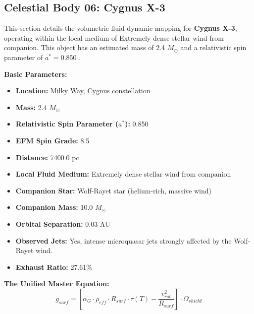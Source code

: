 \documentclass[11pt, a4paper]{article}
\begin{document}
\clearpage
\subsection{Celestial Body 06: Cygnus X-3}
This section details the volumetric fluid-dynamic mapping for \textbf{Cygnus X-3}, operating within the local medium of Extremely dense stellar wind from companion. This object has an estimated mass of 2.4 $M_{\odot}$ and a relativistic spin parameter of $a^* = 0.850$ \cite{zdziarski2013, simbad}.

\vspace{0.5em}
\noindent \textbf{Basic Parameters:}
\begin{itemize}
  \item \textbf{Location:} Milky Way, Cygnus constellation
  \item \textbf{Mass:} 2.4 $M_{\odot}$
  \item \textbf{Relativistic Spin Parameter ($a^*$):} 0.850
  \item \textbf{EFM Spin Grade:} 8.5
  \item \textbf{Distance:} 7400.0 pc
  \item \textbf{Local Fluid Medium:} Extremely dense stellar wind from companion
  \item \textbf{Companion Star:} Wolf-Rayet star (helium-rich, massive wind)
  \item \textbf{Companion Mass:} 10.0 $M_{\odot}$
  \item \textbf{Orbital Separation:} 0.03 AU
  \item \textbf{Observed Jets:} Yes, intense microquasar jets strongly affected by the Wolf-Rayet wind.
  \item \textbf{Exhaust Ratio:} 27.61\%
\end{itemize}

\vspace{0.5em}
\noindent \textbf{The Unified Master Equation:}
$$ g_{surf} = \left[ \alpha_G \cdot \rho_{eff} \cdot R_{surf} \cdot \tau(T) - \frac{v_{rot}^2}{R_{surf}} \right] \cdot \Omega_{shield} $$
\end{document}
